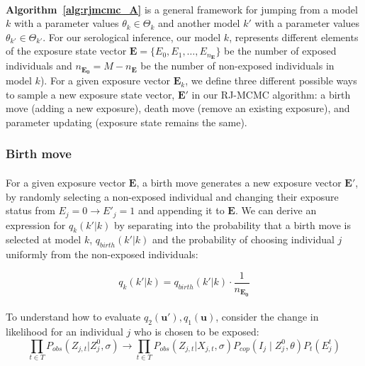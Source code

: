 \paragraph{}\textbf{Algorithm~\ref{alg:rjmcmc_A}} is a general framework for jumping from a model $k$ with a parameter values $\theta_k \in \Theta_k$ and another model $k'$ with a parameter values $\theta_{k'} \in \Theta_{k'}$. For our serological inference, our model $k$, represents different elements of the exposure state vector $\mathbf{E} = \{E_0, E_1, \dots, E_{n_\mathbf{E}}\}$ be the number of exposed individuals and $n_\mathbf{E_0} = M - n_\mathbf{E}$ be the number of non-exposed individuals in model $k$). For a given exposure vector $\mathbf{E}_k$, we define three different possible ways to sample a new exposure state vector, $\mathbf{E'}$ in our RJ-MCMC algorithm: a birth move (adding a new exposure), death move (remove an existing exposure), and parameter updating (exposure state remains the same)\cite{Liang2010-oz}. 

\subsubsection{Birth move}

\paragraph{}For a given exposure vector $\mathbf{E}$, a birth move generates a new exposure vector $\mathbf{E'}$, by randomly selecting a non-exposed individual and changing their exposure status from $E_j = 0 \rightarrow E'_j = 1$ and appending it to $\mathbf{E}$. We can derive an expression for $q_k(k' | k)$ by separating into the probability that a birth move is selected at model $k$, $q_{birth}(k' |k)$ and the probability of choosing individual $j$ uniformly from the non-exposed individuals:

\begin{equation}
q_k(k' | k) = q_{birth}(k' |k)\cdot \frac{1}{n_{\mathbf{E_0}}}
\end{equation}

\paragraph{}To understand how to evaluate $q_2(\mathbf{u}'), q_1(\mathbf{u})$, consider the change in likelihood for an individual $j$ who is chosen to be exposed:
\begin{equation}
\prod_{t \in T}P_{obs}(Z_{j,t}|Z^0_{j}, \sigma)  \rightarrow  \prod_{t \in T}P_{obs}(Z_{j,t}|X_{j,t}, \sigma)P_{cop}(I_j \mid Z^0_{j}, \theta)P_t(E_j^t)
\end{equation}

